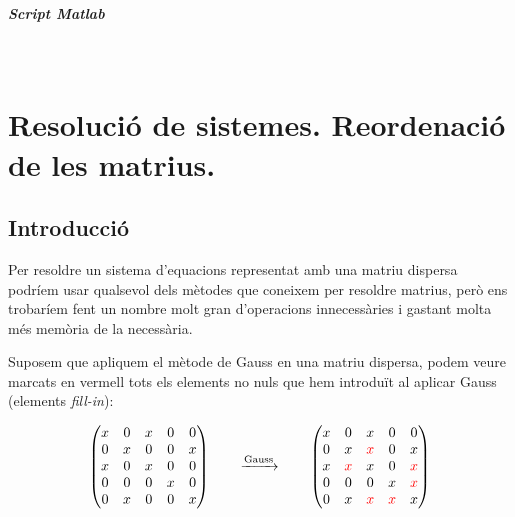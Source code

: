 \documentclass[11pt,a4paper,twoside]{report}
\begin{document}
 \paragraph*{Script Matlab} \mbox{} \\


\chapter{Resolució de sistemes. Reordenació de les matrius.}

\section{Introducció}

Per resoldre un sistema d'equacions representat amb una matriu dispersa podríem usar qualsevol dels mètodes que coneixem per resoldre matrius, però ens trobaríem fent un nombre molt gran d'operacions innecessàries i gastant molta més memòria de la necessària. \newline

Suposem que apliquem el mètode de Gauss en una matriu dispersa, podem veure marcats en vermell tots els elements no nuls que hem introduït al aplicar Gauss (elements \textit{fill-in}):

\[
\begin{pmatrix}
  	x & 0 & x & 0 & 0\\
  	0 & x & 0 & 0 & x\\
  	x & 0 & x & 0 & 0\\
  	0 & 0 & 0 & x & 0\\
  	0 & x & 0 & 0 & x\\
\end{pmatrix} \qquad \xrightarrow{\text{Gauss}} \qquad
\begin{pmatrix}
  	x & 0 & x & 0 & 0\\
  	0 & x & \textcolor{red}{x} & 0 & x\\
  	x & \textcolor{red}{x} & x & 0 & \textcolor{red}{x}\\
  	0 & 0 & 0 & x & \textcolor{red}{x}\\
  	0 & x & \textcolor{red}{x} & \textcolor{red}{x} & x\\
\end{pmatrix}
\]

\end{document}
